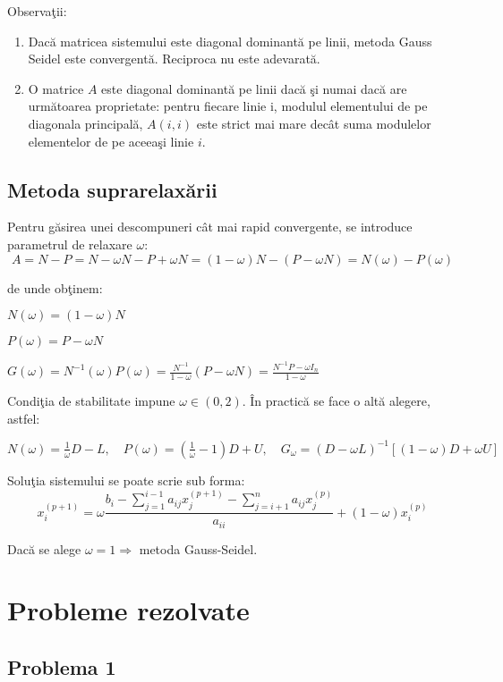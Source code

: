 \documentclass{exam}
\begin{document}
Observa\c{t}ii:
\begin{enumerate}
	\item  Dac\u{a} matricea sistemului este diagonal dominant\u{a} pe linii, metoda Gauss Seidel este convergent\u{a}. Reciproca nu este adevarat\u{a}.
	\item  O matrice $A$ este diagonal dominant\u{a} pe linii dac\u{a} \c{s}i numai dac\u{a} are urm\u{a}toarea proprietate: pentru fiecare linie i, modulul elementului de pe diagonala principal\u{a}, $A(i,i)$ este strict mai mare dec\^{a}t suma modulelor elementelor de pe aceea\c{s}i linie $i$.
\end{enumerate}

\subsection{Metoda suprarelax\u{a}rii}
Pentru g\u{a}sirea unei descompuneri c\^{a}t mai rapid convergente, se introduce parametrul de relaxare $\omega$:
$$A = N - P = N - \omega N - P + \omega N = (1 - \omega)N - (P - \omega N) = N(\omega) - P(\omega)$$

de unde ob\c{t}inem:

$N(\omega) = (1 - \omega)N$

$P(\omega) = P - \omega N$

$G(\omega) = {N}^{-1}(\omega)P(\omega) = \frac{{N}^{-1}}{1-\omega}(P - \omega N) = \frac{{N}^{-1}P - \omega{I}_{n}}{1-\omega}$

Condi\c{t}ia de stabilitate impune $\omega \in (0,2)$. \^{I}n practic\u{a} se face o alt\u{a} alegere, astfel:

$N(\omega) = \frac{1}{\omega}D - L, \quad P(\omega) = (\frac{1}{\omega} - 1)D + U, \quad {G}_{\omega} = (D-\omega L)^{-1}[(1-\omega)D+\omega U]$

Solu\c{t}ia sistemului se poate scrie sub forma:
$$x_{i}^{(p+1)}=\omega\frac{{b}_{i} - \sum_{j = 1}^{i-1}{a}_{ij}{x}_{j}^{(p+1)} - \sum_{j = i + 1}^{n}{a}_{ij}{x}_{j}^{(p)}}{{a}_{ii}}+(1-\omega)x_{i}^{(p)}$$

Dac\u{a} se alege $\omega = 1 \Rightarrow$ metoda Gauss-Seidel.


\section{Probleme rezolvate}

\subsection{Problema 1}
\end{document}
